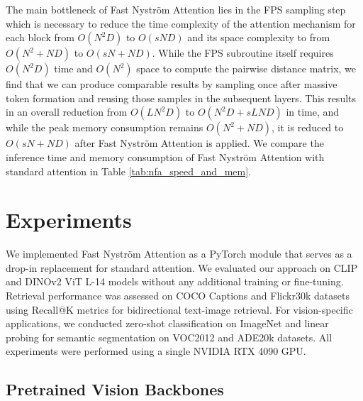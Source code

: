 
The main bottleneck of Fast Nystr\"om Attention lies in the FPS sampling step which is necessary to reduce the time complexity of the attention mechanism for each block from $O(N^2D)$ to $O(sND)$ and its space complexity to from $O(N^2 + ND)$ to $O(sN + ND)$. While the FPS subroutine itself requires $O(N^2D)$ time and $O(N^2)$ space to compute the pairwise distance matrix, we find that we can produce comparable results by sampling once after massive token formation and reusing those samples in the subsequent layers. This results in an overall reduction from $O(LN^2D)$ to $O(N^2D + sLND)$ in time, and while the peak memory consumption remains $O(N^2 + ND)$, it is reduced to $O(sN + ND)$ after Fast Nystr\"om Attention is applied. We compare the inference time and memory consumption of Fast Nystr\"om Attention with standard attention in Table \ref{tab:nfa_speed_and_mem}. 




\section{Experiments}

We implemented Fast Nystr\"om Attention as a PyTorch module that serves as a drop-in replacement for standard attention. We evaluated our approach on CLIP \cite{ilharco2021openclip} \cite{radford2021clip} and DINOv2 \cite{oquab2023dinov2} ViT L-14 models without any additional training or fine-tuning. Retrieval performance was assessed on COCO Captions \cite{chen2015coco} and Flickr30k \cite{young2014flickr} datasets using Recall@K metrics for bidirectional text-image retrieval. For vision-specific applications, we conducted zero-shot classification on ImageNet \cite{deng2009imagenet} and linear probing for semantic segmentation on VOC2012 \cite{pascal-voc-2012} and ADE20k \cite{zhou2017ade} datasets. All experiments were performed using a single NVIDIA RTX 4090 GPU.


\subsection{Pretrained Vision Backbones}



